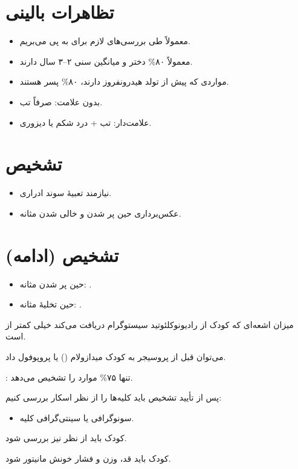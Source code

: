 \section*{تظاهرات بالینی}
\begin{itemize}
\item معمولاً طی بررسی‌های لازم برای  به  پی می‌بریم.
\item معمولاً ۸۰\% دختر و میانگین سنی ۲–۳ سال دارند.
\item مواردی که پیش از تولد هیدرونفروز دارند، ۸۰\% پسر هستند.
\item بدون علامت: صرفاً تب.
\item علامت‌دار: تب + درد شکم یا دیزوری.
\end{itemize}
\section*{تشخیص }
\begin{itemize}
\item نیازمند تعبیهٔ سوند ادراری.
\item عکس‌برداری حین پر شدن و خالی شدن مثانه.
\end{itemize}

\section*{تشخیص (ادامه)}
\begin{itemize}
\item {} حین پر شدن مثانه: .
\item {} حین تخلیهٔ مثانه: .
\end{itemize}
میزان اشعه‌ای که کودک از رادیونوکلئوتید سیستوگرام دریافت می‌کند خیلی کمتر از  است.

می‌توان قبل از پروسیجر به کودک میدازولام () یا پروپوفول داد.

: تنها ۷۵\% موارد  را تشخیص می‌دهد.

پس از تأیید تشخیص  باید کلیه‌ها را از نظر اسکار بررسی کنیم:
\begin{itemize}
\item سونوگرافی یا سینتی‌گرافی کلیه.
\end{itemize}
کودک  باید از نظر  نیز بررسی شود.

کودک  باید قد، وزن و فشار خونش مانیتور شود.

